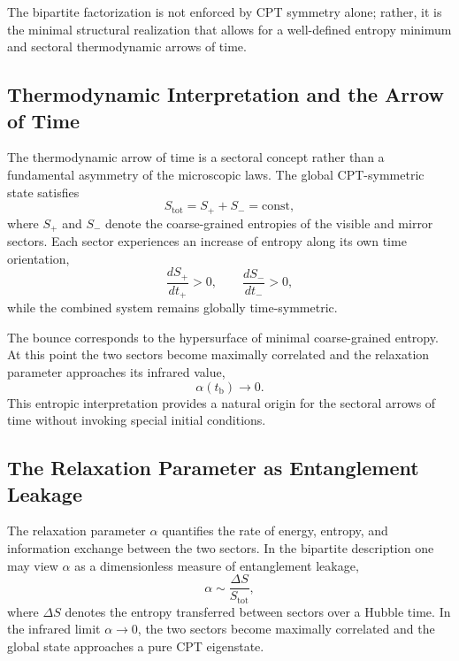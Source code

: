 \documentclass[11pt,a4paper]{article}
\begin{document}
The bipartite factorization is not enforced by CPT symmetry alone; rather, it is
the minimal structural realization that allows for a well-defined entropy minimum
and sectoral thermodynamic arrows of time.


\subsection{Thermodynamic Interpretation and the Arrow of Time}

The thermodynamic arrow of time is a sectoral concept rather than a fundamental
asymmetry of the microscopic laws. The global CPT-symmetric state satisfies
\begin{equation}
    S_{\mathrm{tot}} = S_{+} + S_{-} = \mathrm{const},
\end{equation}
where \(S_{+}\) and \(S_{-}\) denote the coarse-grained entropies of the visible and
mirror sectors. Each sector experiences an increase of entropy along its own time
orientation,
\begin{equation}
    \frac{dS_{+}}{dt_{+}} > 0,
    \qquad
    \frac{dS_{-}}{dt_{-}} > 0,
\end{equation}
while the combined system remains globally time-symmetric.

The bounce corresponds to the hypersurface of minimal coarse-grained entropy. At
this point the two sectors become maximally correlated and the relaxation
parameter approaches its infrared value,
\begin{equation}
    \alpha(t_{\mathrm{b}}) \to 0.
\end{equation}
This entropic interpretation provides a natural origin for the sectoral arrows of
time without invoking special initial conditions.


\subsection{The Relaxation Parameter as Entanglement Leakage}

The relaxation parameter \(\alpha\) quantifies the rate of energy, entropy, and
information exchange between the two sectors. In the bipartite description one
may view \(\alpha\) as a dimensionless measure of entanglement leakage,
\begin{equation}
    \alpha \sim \frac{\Delta S}{S_{\mathrm{tot}}},
\end{equation}
where \(\Delta S\) denotes the entropy transferred between sectors over a Hubble
time. In the infrared limit \(\alpha \to 0\), the two sectors become maximally
correlated and the global state approaches a pure CPT eigenstate.
\end{document}
